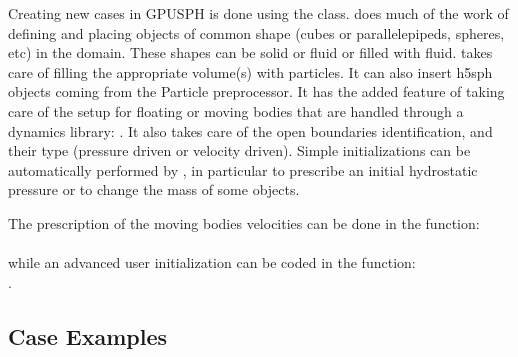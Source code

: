 \documentclass{../GPUSPHtemplate}
\begin{document}

Creating new cases in GPUSPH is done using the  class.
 does much of the work of defining and placing objects of common shape 
(cubes or parallelepipeds, spheres, etc) in the domain. 
These shapes can be solid or fluid or filled with fluid.  
 takes care of filling the appropriate volume(s) with particles.   
It can also insert h5sph objects coming from the Particle preprocessor. 
It has the added feature of taking care of the setup for floating or moving 
bodies that are handled through a dynamics library:  .  
It also takes care of the open boundaries identification, and their type (pressure driven or velocity driven).
Simple initializations can be automatically performed by , in particular to prescribe an initial
hydrostatic pressure or to change the mass of some objects.

The prescription of the moving bodies velocities can be done in the function:\\
\\
while an advanced user initialization can be coded in the function:\\
.

\subsection{Case Examples}
\end{document}
